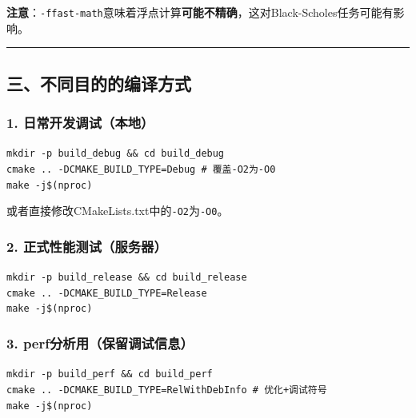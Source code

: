 \documentclass[11pt, a4paper]{article}
\begin{document}
\begin{aibox}
\textbf{注意}：\texttt{-ffast-math}意味着浮点计算\textbf{可能不精确}，这对Black-Scholes任务可能有影响。

\begin{center}\rule{\textwidth}{0.4pt}\end{center}

\subsection*{三、不同目的的编译方式}

\subsubsection*{1. 日常开发调试（本地）}
\begin{tcolorbox}[colback=white,colframe=gray!50!white,boxrule=0.5pt,arc=2pt,left=5pt,right=5pt,top=5pt,bottom=5pt]
\texttt{mkdir -p build\_debug \&\& cd build\_debug}\\
\texttt{cmake .. -DCMAKE\_BUILD\_TYPE=Debug  \# 覆盖-O2为-O0}\\
\texttt{make -j\$(nproc)}
\end{tcolorbox}
或者直接修改CMakeLists.txt中的\texttt{-O2}为\texttt{-O0}。

\subsubsection*{2. 正式性能测试（服务器）}
\begin{tcolorbox}[colback=white,colframe=gray!50!white,boxrule=0.5pt,arc=2pt,left=5pt,right=5pt,top=5pt,bottom=5pt]
\texttt{mkdir -p build\_release \&\& cd build\_release}\\
\texttt{cmake .. -DCMAKE\_BUILD\_TYPE=Release}\\
\texttt{make -j\$(nproc)}
\end{tcolorbox}

\subsubsection*{3. perf分析用（保留调试信息）}
\begin{tcolorbox}[colback=white,colframe=gray!50!white,boxrule=0.5pt,arc=2pt,left=5pt,right=5pt,top=5pt,bottom=5pt]
\texttt{mkdir -p build\_perf \&\& cd build\_perf}\\
\texttt{cmake .. -DCMAKE\_BUILD\_TYPE=RelWithDebInfo  \# 优化+调试符号}\\
\texttt{make -j\$(nproc)}
\end{tcolorbox}


\end{aibox}
\end{document}

